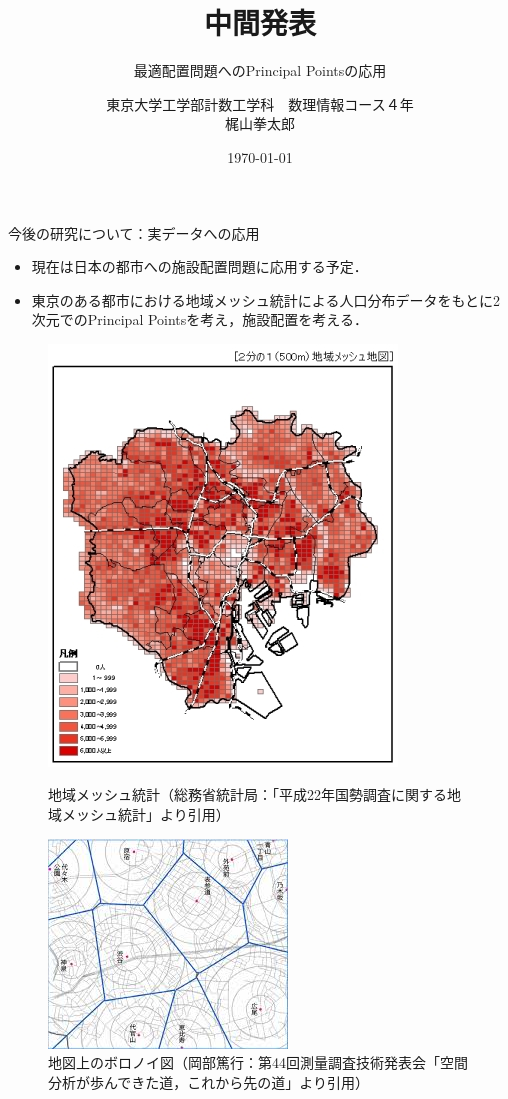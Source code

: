 \documentclass[unicode,11pt]{beamer}
\title{中間発表}
\subtitle{最適配置問題へのPrincipal Pointsの応用}
\author{東京大学工学部計数工学科　数理情報コース４年\\梶山拳太郎}
\date{\today}
\institute{指導教員：松田孟留}
\begin{document}
\begin{frame}
    \titlepage
\end{frame}

\begin{frame}{今後の研究について：実データへの応用}
    \begin{itemize}
        \item 現在は日本の都市への施設配置問題に応用する予定．
        \item 東京のある都市における地域メッシュ統計による人口分布データをもとに2次元でのPrincipal Pointsを考え，施設配置を考える．
    \end{itemize}
    \begin{figure}[htbp]
        \begin{minipage}[b]{0.48\linewidth}
            \centering
            \includegraphics[keepaspectratio, scale=0.4]{tokyo_mesh_h22.jpeg}
            \caption{地域メッシュ統計（総務省統計局：「平成22年国勢調査に関する地域メッシュ統計」より引用）}
        \end{minipage}
        \begin{minipage}[b]{0.48\linewidth}
            \centering
            \includegraphics[keepaspectratio, scale=0.4]{voronoi_okabe.jpeg}
            \caption{地図上のボロノイ図（岡部篤行：第44回測量調査技術発表会「空間分析が歩んできた道，これから先の道」より引用）}
        \end{minipage}
    \end{figure}
\end{frame}
\end{document}
